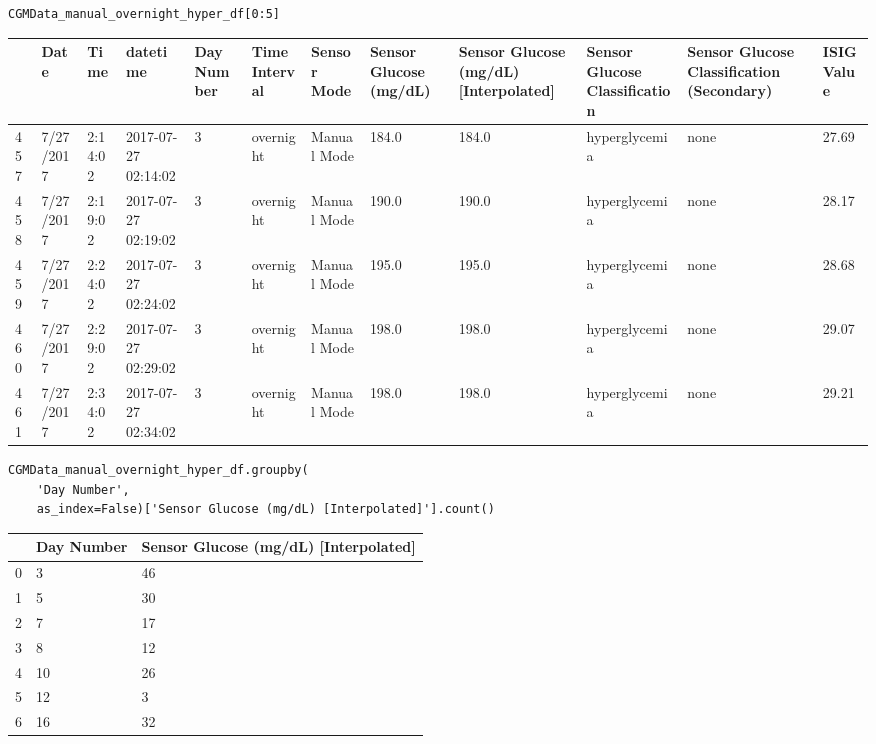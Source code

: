 \bigskip

\begin{verbatim}
CGMData_manual_overnight_hyper_df[0:5]
\end{verbatim}

\bigskip\noindent
\begin{tabular}{p{}p{}p{}p{}p{}p{}p{}p{}p{}p{}p{}p{}}
\toprule
 & Date & Time & datetime & Day Number & Time Interval & Sensor Mode & Sensor Glucose (mg/dL) & Sensor Glucose (mg/dL) [Interpolated] & Sensor Glucose Classification & Sensor Glucose Classification (Secondary) & ISIG Value \\
\hline
457 & 7/27/2017 & 2:14:02 & 2017-07-27 02:14:02 & 3 & overnight & Manual Mode & 184.0 & 184.0 & hyperglycemia & none & 27.69 \\
\hline
458 & 7/27/2017 & 2:19:02 & 2017-07-27 02:19:02 & 3 & overnight & Manual Mode & 190.0 & 190.0 & hyperglycemia & none & 28.17 \\
\hline
459 & 7/27/2017 & 2:24:02 & 2017-07-27 02:24:02 & 3 & overnight & Manual Mode & 195.0 & 195.0 & hyperglycemia & none & 28.68 \\
\hline
460 & 7/27/2017 & 2:29:02 & 2017-07-27 02:29:02 & 3 & overnight & Manual Mode & 198.0 & 198.0 & hyperglycemia & none & 29.07 \\
\hline
461 & 7/27/2017 & 2:34:02 & 2017-07-27 02:34:02 & 3 & overnight & Manual Mode & 198.0 & 198.0 & hyperglycemia & none & 29.21 \\
\hline
\bottomrule
\end{tabular}

\bigskip

\begin{verbatim}
CGMData_manual_overnight_hyper_df.groupby(
    'Day Number', 
    as_index=False)['Sensor Glucose (mg/dL) [Interpolated]'].count()
\end{verbatim}

\bigskip\noindent
\begin{tabular}{p{}p{}p{}}
\toprule
 & Day Number & Sensor Glucose (mg/dL) [Interpolated] \\
\hline
0 & 3 & 46 \\
\hline
1 & 5 & 30 \\
\hline
2 & 7 & 17 \\
\hline
3 & 8 & 12 \\
\hline
4 & 10 & 26 \\
\hline
5 & 12 & 3 \\
\hline
6 & 16 & 32 \\
\hline
\bottomrule
\end{tabular}

